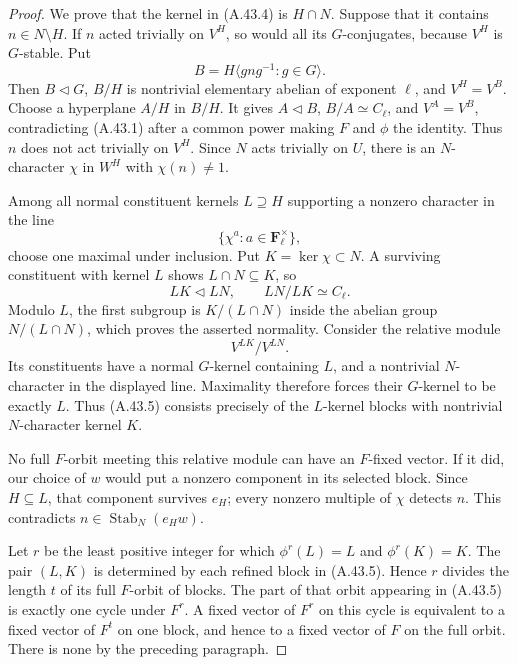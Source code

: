 \documentclass[11pt]{article}
\begin{document}
\begin{proof}
We prove that the kernel in (A.43.4) is \(H\cap N\).
Suppose that it contains \(n\in N\setminus H\).
If \(n\) acted trivially on \(V^H\), so would all its
\(G\)-conjugates, because \(V^H\) is \(G\)-stable. Put
\[
 B=H\langle gng^{-1}:g\in G\rangle.
\]
Then \(B\triangleleft G\), \(B/H\) is nontrivial
elementary abelian of exponent \(\ell\), and
\(V^H=V^B\). Choose a hyperplane \(A/H\) in \(B/H\).
It gives \(A\triangleleft B\), \(B/A\simeq C_\ell\),
and \(V^A=V^B\), contradicting (A.43.1) after a
common power making \(F\) and \(\phi\) the identity.
Thus \(n\) does not act trivially on \(V^H\).
Since \(N\) acts trivially on \(U\),
there is an \(N\)-character \(\chi\) in \(W^H\)
with \(\chi(n)\ne1\).

Among all normal constituent kernels \(L\supseteq H\)
supporting a nonzero character in the line
\[
                 \{\chi^a: a\in\mathbf F_\ell^\times\},
\]
choose one maximal under inclusion. Put
\(K=\ker\chi\subset N\). A surviving constituent with
kernel \(L\) shows \(L\cap N\subseteq K\), so
\[
                         LK\triangleleft LN,\qquad
                         LN/LK\simeq C_\ell.
\]
Modulo \(L\), the first subgroup is
\(K/(L\cap N)\) inside the abelian group
\(N/(L\cap N)\), which proves the asserted normality.
Consider the relative module
\[
                         V^{LK}/V^{LN}.
                         \tag{A.43.5}
\]
Its constituents have a normal \(G\)-kernel containing
\(L\), and a nontrivial \(N\)-character in the displayed
line. Maximality therefore forces their \(G\)-kernel
to be exactly \(L\). Thus (A.43.5) consists precisely
of the \(L\)-kernel blocks with nontrivial \(N\)-character
kernel \(K\).

No full \(F\)-orbit meeting this relative module can
have an \(F\)-fixed vector. If it did, our choice of
\(w\) would put a nonzero component in its selected
block. Since \(H\subseteq L\), that component survives
\(e_H\); every nonzero multiple of \(\chi\) detects
\(n\). This contradicts \(n\in\operatorname{Stab}_N(e_Hw)\).

Let \(r\) be the least positive integer for which
\(\phi^r(L)=L\) and \(\phi^r(K)=K\). The pair \((L,K)\)
is determined by each refined block in (A.43.5).
Hence \(r\) divides the length \(t\) of its full
\(F\)-orbit of blocks. The part of that orbit appearing
in (A.43.5) is exactly one cycle under \(F^r\).
A fixed vector of \(F^r\) on this cycle is equivalent
to a fixed vector of \(F^t\) on one block, and hence
to a fixed vector of \(F\) on the full orbit.
There is none by the preceding paragraph.


\end{proof}
\end{document}
